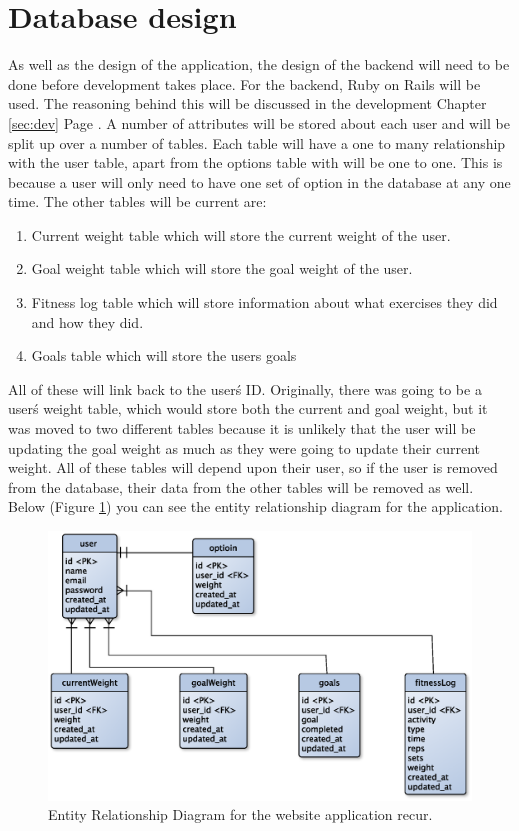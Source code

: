 \section{Database design}
As well as the design of the application, the design of the backend will need to be done before development takes place. For the backend, Ruby on Rails \citep{rails:2013} will be used. The reasoning behind this will be discussed in the development Chapter \ref{sec:dev} Page \pageref{sec:dev}. A number of attributes will be stored about each user and will be split up over a number of tables. Each table will have a one to many relationship with the user table, apart from the options table with will be one to one. This is because a user will only need to have one set of option in the database at any one time. The other tables will be current are:

\begin{enumerate}
\item Current weight table which will store the current weight of the user.
\item Goal weight table which will store the goal weight of the user.
\item Fitness log table which will store information about what exercises they did and how they did.
\item Goals table which will store the users goals
\end{enumerate}

\noindent
All of these will link back to the user\'s ID. Originally, there was going to be a user\'s weight table, which would store both the current and goal weight, but it was moved to two different tables because it is unlikely that the user will be updating the goal weight as much as they were going to update their current weight. All of these tables will depend upon their user, so if the user is removed from the database, their data from the other tables will be removed as well. Below (Figure \ref{fig:erd}) you can see the entity relationship diagram for the application.

\begin{figure}[!ht]
\centering
\includegraphics[scale=0.5]{chapters/figs/erd}
\caption{Entity Relationship Diagram for the website application recur.}
\label{fig:erd}
\end{figure}

